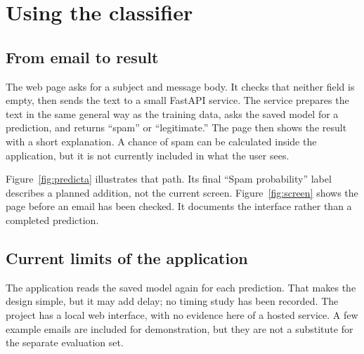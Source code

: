 \chapter{Using the classifier}
\section{From email to result}
The web page asks for a subject and message body. It checks that neither field is empty, then sends the text to a small FastAPI service. The service prepares the text in the same general way as the training data, asks the saved model for a prediction, and returns ``spam'' or ``legitimate.'' The page then shows the result with a short explanation. A chance of spam can be calculated inside the application, but it is not currently included in what the user sees.

Figure~\ref{fig:predicta} illustrates that path. Its final ``Spam probability'' label describes a planned addition, not the current screen. Figure~\ref{fig:screen} shows the page before an email has been checked. It documents the interface rather than a completed prediction.


\section{Current limits of the application}
The application reads the saved model again for each prediction. That makes the design simple, but it may add delay; no timing study has been recorded. The project has a local web interface, with no evidence here of a hosted service. A few example emails are included for demonstration, but they are not a substitute for the separate evaluation set.
